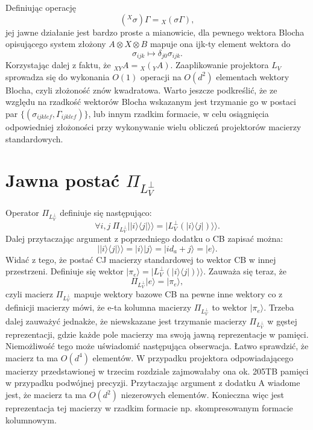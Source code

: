 \documentclass[10pt]{article} %
\newcommand{\Ket}[1]{|#1\rangle}
\newcommand{\Bra}[1]{\langle#1|}
\newcommand{\KKet}[1]{|#1\rangle\rangle}
\newcommand{\LPV}{{L^\perp_V}}
\begin{document}
\begin{appendices}
Definiując operację
\begin{equation}
({}^X\sigma) \Gamma = {}_X(\sigma\Gamma),
\end{equation} jej jawne działanie jest bardzo proste a mianowicie, dla pewnego wektora Blocha opisującego system złożony $A \otimes X \otimes B$ mapuje ona ijk-ty element wektora do
\begin{equation}
\sigma_{ijk} \mapsto \delta_{j0}\sigma_{ijk}.
\end{equation}
Korzystając dalej z faktu, że ${}_{XY}A = {}_X({}_Y A)$. Zaaplikowanie projektora $L_V$ sprowadza się do wykonania $O(1)$ operacji na $O(d^2)$ elementach wektory Blocha, czyli złożoność znów kwadratowa.
Warto jeszcze podkreślić, że ze względu na rzadkość wektorów Blocha wskazanym jest trzymanie go w postaci par $\{ (\sigma_{ijklef}, \Gamma_{ijklef}) \}$, lub innym rzadkim formacie, w celu osiągnięcia odpowiedniej złożoności przy wykonywanie wielu obliczeń projektorów macierzy standardowych.
\section{Jawna postać $\Pi_\LPV$}
Operator $\Pi_\LPV$ definiuje się następująco:
\begin{equation}
\forall i,j~\Pi_\LPV \KKet{\Ket{i}\Bra{j}} = \KKet{\LPV(\Ket{i}\Bra{j})}.
\end{equation}
Dalej przytaczając argument z poprzedniego dodatku o CB zapisać można:
\begin{equation}
\KKet{\Ket{i}\Bra{j}} = \Ket{i}\Ket{j} = \Ket{i d_a + j} = \Ket{e}.
\end{equation} Widać z tego, że postać CJ macierzy standardowej to wektor CB w innej przestrzeni.
Definiuje się wektor $\Ket{\pi_{e}} = \KKet{\LPV(\Ket{i}\Bra{j})}$. Zauważa się teraz, że 
\begin{equation}
\Pi_\LPV \Ket{e} = \Ket{\pi_{e}},
\end{equation} czyli macierz $\Pi_\LPV$ mapuje wektory bazowe CB na pewne inne wektory co z definicji macierzy mówi, że e-ta kolumna macierzy $\Pi_\LPV$ to wektor $\Ket{\pi_{e}}$.
Trzeba dalej zauważyć jednakże, że niewskazane jest trzymanie macierzy $\Pi_\LPV$ w gęstej reprezentacji, gdzie każde pole macierzy ma swoją jawną reprezentacje w pamięci.
Niemożliwość tego może uświadomić następująca obserwacja. Łatwo sprawdzić, że macierz ta ma $O(d^4)$ elementów. W przypadku projektora odpowiadającego macierzy przedstawionej w trzecim rozdziale zajmowałaby ona ok. 205TB pamięci w przypadku podwójnej precyzji.
Przytaczając argument z dodatku A wiadome jest, że macierz ta ma $O(d^2)$ niezerowych elementów. Konieczna więc jest reprezentacja tej macierzy w rzadkim formacie np. skompresowanym formacie kolumnowym.
\end{appendices}
\end{document}
